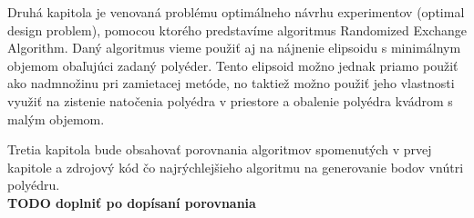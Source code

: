 Druhá kapitola je venovaná problému optimálneho návrhu experimentov (optimal design problem), pomocou ktorého predstavíme algoritmus Randomized Exchange Algorithm. Daný algoritmus vieme použiť aj na nájnenie elipsoidu s minimálnym objemom obaľujúci zadaný polyéder. Tento elipsoid možno jednak priamo použiť ako nadmnožinu pri zamietacej metóde, no taktiež možno použiť jeho vlastnosti využiť na zistenie natočenia polyédra v priestore a obalenie polyédra kvádrom s malým objemom.

Tretia kapitola bude obsahovať porovnania algoritmov spomenutých v prvej kapitole a zdrojový kód čo najrýchlejšieho algoritmu na generovanie bodov vnútri polyédru. \\

\textbf{TODO doplniť po dopísaní porovnania}
